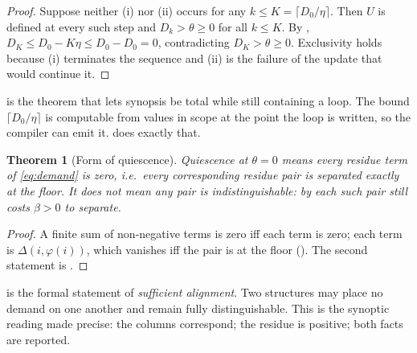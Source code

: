 \documentclass[11pt,twocolumn,a4paper]{article}
\theoremstyle{plain}
\newtheorem{theorem}{Theorem}[section]
\theoremstyle{definition}
\theoremstyle{remark}
\newcommand{\flo}{\beta}                       %
\newcommand{\dem}{D}
\newcommand{\corr}{\varphi}
\begin{document}
\begin{proof}
Suppose neither (i) nor (ii) occurs for any
$k\le K=\lceil \dem_0/\eta\rceil$. Then $U$ is defined at every such
step and $\dem_k>\theta\ge0$ for all $k\le K$. By ,
$\dem_K\le \dem_0-K\eta\le \dem_0-\dem_0=0$, contradicting
$\dem_K>\theta\ge0$. Exclusivity holds because (i) terminates the
sequence and (ii) is the failure of the update that would continue it.
\end{proof}

 is the theorem that lets synopsis be total while
still containing a loop. The bound $\lceil \dem_0/\eta\rceil$ is
computable from values in scope at the point the loop is written, so the
compiler can emit it.  does exactly that.

\begin{theorem}[Form of quiescence]
\label{thm:form}
Quiescence at $\theta=0$ means every residue term of \eqref{eq:demand}
is zero, i.e.\ every corresponding residue pair is separated exactly at
the floor. It does \emph{not} mean any pair is indistinguishable: by
 each such pair still costs $\flo>0$ to separate.
\end{theorem}

\begin{proof}
A finite sum of non-negative terms is zero iff each term is zero; each
term is $\Delta(i,\corr(i))$, which vanishes iff the pair is at the
floor (). The second statement is .
\end{proof}

 is the formal statement of \emph{sufficient alignment}.
Two structures may place no demand on one another and remain fully
distinguishable. This is the synoptic reading made precise: the columns
correspond; the residue is positive; both facts are reported.
\end{document}

